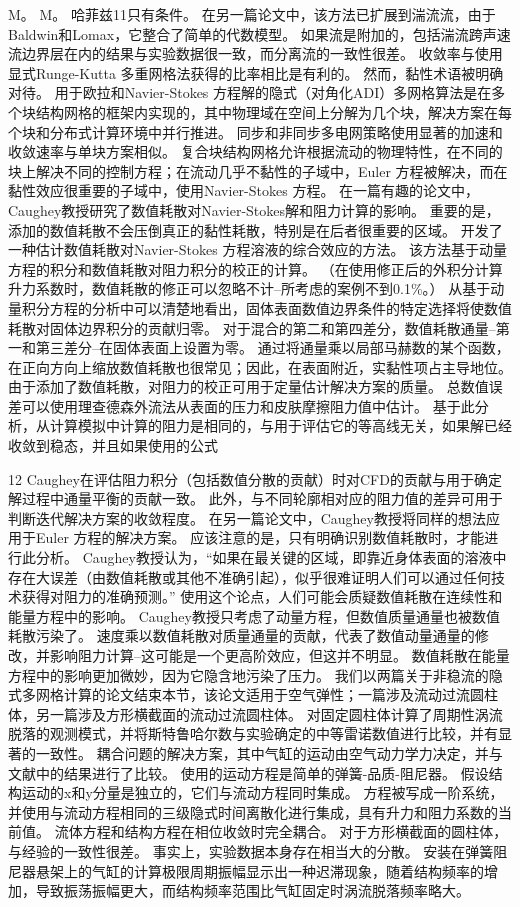 \documentclass[UTF8,11pt,a4paper,openany,fontset=fandol]{ctexbook}
\begin{document}
M。 M。 哈菲兹11只有条件。 在另一篇论文中，该方法已扩展到湍流流，由于Baldwin和Lomax，它整合了简单的代数模型。 如果流是附加的，包括湍流跨声速流边界层在内的结果与实验数据很一致，而分离流的一致性很差。 收敛率与使用显式Runge-Kutta 多重网格法获得的比率相比是有利的。 然而，黏性术语被明确对待。 用于欧拉和Navier-Stokes 方程解的隐式（对角化ADI）多网格算法是在多个块结构网格的框架内实现的，其中物理域在空间上分解为几个块，解决方案在每个块和分布式计算环境中并行推进。 同步和非同步多电网策略使用显著的加速和收敛速率与单块方案相似。 复合块结构网格允许根据流动的物理特性，在不同的块上解决不同的控制方程；在流动几乎不黏性的子域中，Euler 方程被解决，而在黏性效应很重要的子域中，使用Navier-Stokes 方程。 在一篇有趣的论文中，Caughey教授研究了数值耗散对Navier-Stokes解和阻力计算的影响。 重要的是，添加的数值耗散不会压倒真正的黏性耗散，特别是在后者很重要的区域。 开发了一种估计数值耗散对Navier-Stokes 方程溶液的综合效应的方法。 该方法基于动量方程的积分和数值耗散对阻力积分的校正的计算。 （在使用修正后的外积分计算升力系数时，数值耗散的修正可以忽略不计--所考虑的案例不到0.1\%。） 从基于动量积分方程的分析中可以清楚地看出，固体表面数值边界条件的特定选择将使数值耗散对固体边界积分的贡献归零。 对于混合的第二和第四差分，数值耗散通量--第一和第三差分--在固体表面上设置为零。 通过将通量乘以局部马赫数的某个函数，在正向方向上缩放数值耗散也很常见；因此，在表面附近，实黏性项占主导地位。 由于添加了数值耗散，对阻力的校正可用于定量估计解决方案的质量。 总数值误差可以使用理查德森外流法从表面的压力和皮肤摩擦阻力值中估计。 基于此分析，从计算模拟中计算的阻力是相同的，与用于评估它的等高线无关，如果解已经收敛到稳态，并且如果使用的公式

12 Caughey在评估阻力积分（包括数值分散的贡献）时对CFD的贡献与用于确定解过程中通量平衡的贡献一致。 此外，与不同轮廓相对应的阻力值的差异可用于判断迭代解决方案的收敛程度。 在另一篇论文中，Caughey教授将同样的想法应用于Euler 方程的解决方案。 应该注意的是，只有明确识别数值耗散时，才能进行此分析。 Caughey教授认为，“如果在最关键的区域，即靠近身体表面的溶液中存在大误差（由数值耗散或其他不准确引起），似乎很难证明人们可以通过任何技术获得对阻力的准确预测。” 使用这个论点，人们可能会质疑数值耗散在连续性和能量方程中的影响。 Caughey教授只考虑了动量方程，但数值质量通量也被数值耗散污染了。 速度乘以数值耗散对质量通量的贡献，代表了数值动量通量的修改，并影响阻力计算--这可能是一个更高阶效应，但这并不明显。 数值耗散在能量方程中的影响更加微妙，因为它隐含地污染了压力。 我们以两篇关于非稳流的隐式多网格计算的论文结束本节，该论文适用于空气弹性；一篇涉及流动过流圆柱体，另一篇涉及方形横截面的流动过流圆柱体。 对固定圆柱体计算了周期性涡流脱落的观测模式，并将斯特鲁哈尔数与实验确定的中等雷诺数值进行比较，并有显著的一致性。 耦合问题的解决方案，其中气缸的运动由空气动力学力决定，并与文献中的结果进行了比较。 使用的运动方程是简单的弹簧-品质-阻尼器。 假设结构运动的x和y分量是独立的，它们与流动方程同时集成。 方程被写成一阶系统，并使用与流动方程相同的三级隐式时间离散化进行集成，具有升力和阻力系数的当前值。 流体方程和结构方程在相位收敛时完全耦合。 对于方形横截面的圆柱体，与经验的一致性很差。 事实上，实验数据本身存在相当大的分散。 安装在弹簧阻尼器悬架上的气缸的计算极限周期振幅显示出一种迟滞现象，随着结构频率的增加，导致振荡振幅更大，而结构频率范围比气缸固定时涡流脱落频率略大。
\end{document}
